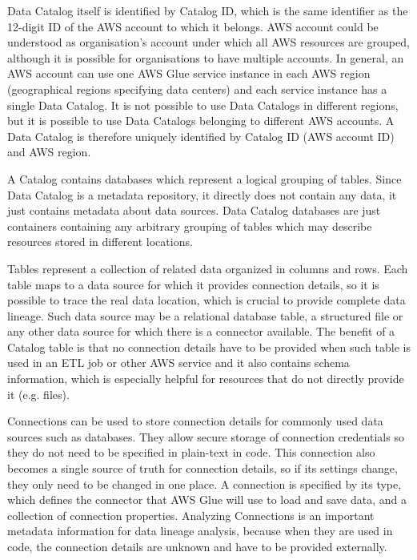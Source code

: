 \par
Data Catalog itself is identified by Catalog ID, which is the same identifier as the 12-digit ID of the AWS account to which it belongs. AWS account could be understood as organisation's account under which all AWS resources are grouped, although it is possible for organisations to have multiple accounts. In general, an AWS account can use one AWS Glue service instance in each AWS region (geographical regions specifying data centers) and each service instance has a single Data Catalog. It is not possible to use Data Catalogs in different regions, but it is possible to use Data Catalogs belonging to different AWS accounts. A Data Catalog is therefore uniquely identified by Catalog ID (AWS account ID) and AWS region.
\par
A Catalog contains databases which represent a logical grouping of tables. Since Data Catalog is a metadata repository, it directly does not contain any data, it just contains metadata about data sources. Data Catalog databases are just containers containing any arbitrary grouping of tables which may describe resources stored in different locations.
\par
Tables represent a collection of related data organized in columns and rows. Each table maps to a data source for which it provides connection details, so it is possible to trace the real data location, which is crucial to provide complete data lineage. Such data source may be a relational database table, a structured file or any other data source for which there is a connector available. The benefit of a Catalog table is that no connection details have to be provided when such table is used in an ETL job or other AWS service and it also contains schema information, which is especially helpful for resources that do not directly provide it (e.g. files). 
\par
Connections can be used to store connection details for commonly used data sources such as databases. They allow secure storage of connection credentials so they do not need to be specified in plain-text in code. This connection also becomes a single source of truth for connection details, so if its settings change, they only need to be changed in one place. A connection is specified by its type, which defines the connector that AWS Glue will use to load and save data, and a collection of connection properties. Analyzing Connections is an important metadata information for data lineage analysis, because when they are used in code, the connection details are unknown and have to be provided externally.


